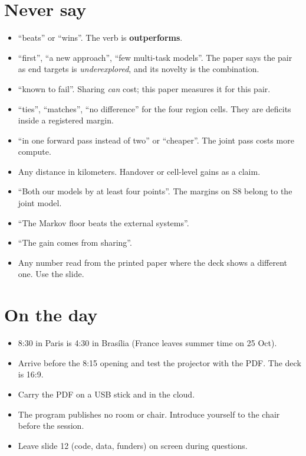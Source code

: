 \section{Never say}
\begin{itemize}
  \item ``beats'' or ``wins''. The verb is \textbf{outperforms}.
  \item ``first'', ``a new approach'', ``few multi-task models''. The paper says the pair as end targets
        is \emph{underexplored}, and its novelty is the combination.
  \item ``known to fail''. Sharing \emph{can} cost; this paper measures it for this pair.
  \item ``ties'', ``matches'', ``no difference'' for the four region cells. They are deficits inside a
        registered margin.
  \item ``in one forward pass instead of two'' or ``cheaper''. The joint pass costs more compute.
  \item Any distance in kilometers. Handover or cell-level gains as a claim.
  \item ``Both our models by at least four points''. The margins on S8 belong to the joint model.
  \item ``The Markov floor beats the external systems''.
  \item ``The gain comes from sharing''.
  \item Any number read from the printed paper where the deck shows a different one. Use the slide.
\end{itemize}

\section{On the day}
\begin{itemize}
  \item 8:30 in Paris is 4:30 in Brasília (France leaves summer time on 25 Oct).
  \item Arrive before the 8:15 opening and test the projector with the PDF. The deck is 16:9.
  \item Carry the PDF on a USB stick and in the cloud.
  \item The program publishes no room or chair. Introduce yourself to the chair before the session.
  \item Leave slide 12 (code, data, funders) on screen during questions.
\end{itemize}

\newpage
